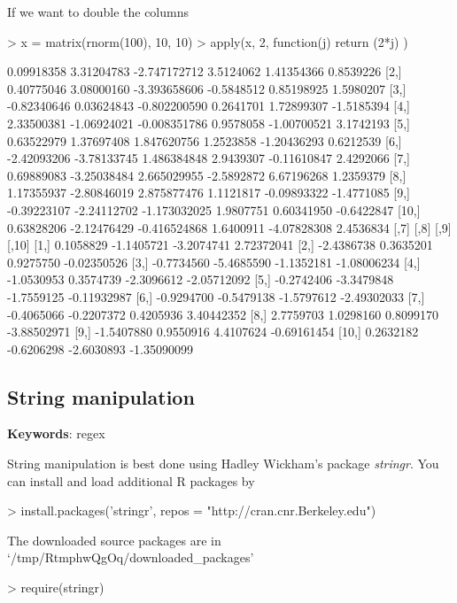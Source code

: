 \documentclass{article}
\begin{document}
If we want to double the columns

\begin{Schunk}
\begin{Sinput}
> x = matrix(rnorm(100), 10, 10)
> apply(x, 2, function(j) { return (2*j) } )
\end{Sinput}
\begin{Soutput}
             [,1]        [,2]         [,3]       [,4]        [,5]       [,6]
 [1,]  0.09918358  3.31204783 -2.747172712  3.5124062  1.41354366  0.8539226
 [2,]  0.40775046  3.08000160 -3.393658606 -0.5848512  0.85198925  1.5980207
 [3,] -0.82340646  0.03624843 -0.802200590  0.2641701  1.72899307 -1.5185394
 [4,]  2.33500381 -1.06924021 -0.008351786  0.9578058 -1.00700521  3.1742193
 [5,]  0.63522979  1.37697408  1.847620756  1.2523858 -1.20436293  0.6212539
 [6,] -2.42093206 -3.78133745  1.486384848  2.9439307 -0.11610847  2.4292066
 [7,]  0.69889083 -3.25038484  2.665029955 -2.5892872  6.67196268  1.2359379
 [8,]  1.17355937 -2.80846019  2.875877476  1.1121817 -0.09893322 -1.4771085
 [9,] -0.39223107 -2.24112702 -1.173032025  1.9807751  0.60341950 -0.6422847
[10,]  0.63828206 -2.12476429 -0.416524868  1.6400911 -4.07828308  2.4536834
            [,7]       [,8]       [,9]       [,10]
 [1,]  0.1058829 -1.1405721 -3.2074741  2.72372041
 [2,] -2.4386738  0.3635201  0.9275750 -0.02350526
 [3,] -0.7734560 -5.4685590 -1.1352181 -1.08006234
 [4,] -1.0530953  0.3574739 -2.3096612 -2.05712092
 [5,] -0.2742406 -3.3479848 -1.7559125 -0.11932987
 [6,] -0.9294700 -0.5479138 -1.5797612 -2.49302033
 [7,] -0.4065066 -0.2207372  0.4205936  3.40442352
 [8,]  2.7759703  1.0298160  0.8099170 -3.88502971
 [9,] -1.5407880  0.9550916  4.4107624 -0.69161454
[10,]  0.2632182 -0.6206298 -2.6030893 -1.35090099
\end{Soutput}
\end{Schunk}

\subsection{String manipulation}
\textbf{Keywords}: regex

String manipulation is best done using Hadley Wickham's package \textit{stringr}.
You can install and load additional R packages by

\begin{Schunk}
\begin{Sinput}
> install.packages('stringr', repos = "http://cran.cnr.Berkeley.edu")
\end{Sinput}
\begin{Soutput}
The downloaded source packages are in
	‘/tmp/RtmphwQgOq/downloaded_packages’
\end{Soutput}
\begin{Sinput}
> require(stringr)
\end{Sinput}
\end{Schunk}
\end{document}
